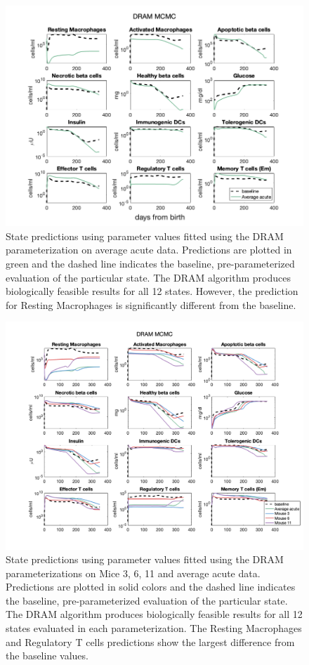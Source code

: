 \begin{appendices}
\begin{figure}[H] 
    \centering
    \includegraphics[width=15cm]{MCMC_figs/dram_t1d_final/allState_avg.png}
    \caption{State predictions using parameter values fitted using the DRAM parameterization on average acute data. Predictions are plotted in green and the dashed line indicates the baseline, pre-parameterized evaluation of the particular state. The DRAM algorithm produces biologically feasible results for all 12 states. However, the prediction for Resting Macrophages is significantly different from the baseline.}
    \label{fig:dram_biocheck2}
\end{figure}
\begin{figure}[H] 
    \centering
    \includegraphics[width=15cm]{MCMC_figs/dram_t1d_final/allState_comp_3_6_11_avg.png}
    \caption{State predictions using parameter values fitted using the DRAM parameterizations on Mice 3, 6, 11 and average acute data. Predictions are plotted in solid colors and the dashed line indicates the baseline, pre-parameterized evaluation of the particular state. The DRAM algorithm produces biologically feasible results for all 12 states evaluated in each parameterization. The Resting Macrophages and Regulatory T cells predictions show the largest difference from the baseline values.}
    \label{fig:dram_biocheck3}
\end{figure}



\end{appendices}
